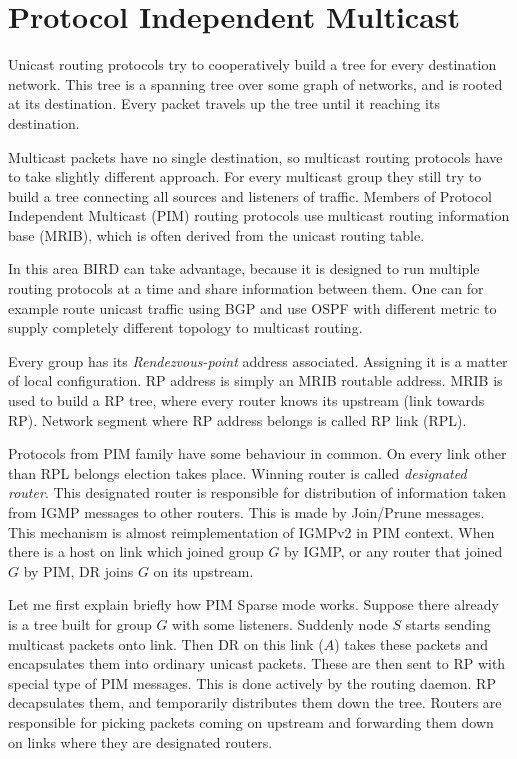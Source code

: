 \chapter{Protocol Independent Multicast}

Unicast routing protocols try to cooperatively build a tree for every
destination network. This tree is a spanning tree over some graph of networks,
and is rooted at its destination. Every packet travels up the tree until it
reaching its destination.

Multicast packets have no single destination, so multicast routing protocols
have to take slightly different approach. For every multicast group they still
try to build a tree connecting all sources and listeners of traffic. Members of
Protocol Independent Multicast (PIM) routing protocols use multicast routing
information base (MRIB), which is often derived from the unicast routing table.

In this area BIRD can take advantage, because it is designed to run multiple
routing protocols at a time and share information between them. One can for
example route unicast traffic using BGP and use OSPF with different metric to
supply completely different topology to multicast routing.

Every group has its \emph{Rendezvous-point} address associated. Assigning it is
a matter of local configuration. RP address is simply an MRIB routable
address. MRIB is used to build a RP tree, where every router knows its upstream
(link towards RP). Network segment where RP address belongs is called RP link
(RPL).

Protocols from PIM family have some behaviour in common. On every link other
than RPL belongs election takes place. Winning router is called
\emph{designated router}. This designated router is responsible for
distribution of information taken from IGMP messages to other routers. This is
made by Join/Prune messages. This mechanism is almost reimplementation of
IGMPv2 in PIM context. When there is a host on link which joined group $G$ by
IGMP, or any router that joined $G$ by PIM, DR joins $G$ on
its upstream.

Let me first explain briefly how PIM Sparse mode works. Suppose there already
is a tree built for group $G$ with some listeners. Suddenly node $S$ starts
sending multicast packets onto link. Then DR on this link ($A$) takes these
packets and encapsulates them into ordinary unicast packets. These are then
sent to RP with special type of PIM messages. This is done actively by the
routing daemon. RP decapsulates them, and temporarily distributes them down the
tree. Routers are responsible for picking packets coming on upstream and
forwarding them down on links where they are designated routers.


